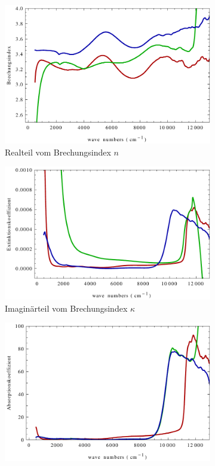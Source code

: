 \documentclass[paper=a4,fontsize=10pt,DIV=18,twocolumn,parskip=half]{scrartcl}
\numberwithin{equation}{section}    %
\begin{document}
\begin{figure}
    \centering
    \begin{subfigure}{\columnwidth}
        \includegraphics[width=\textwidth]{Bilder/brechzahl}
        \caption{Realteil vom Brechungsindex $n$}
        \label{bz}
    \end{subfigure}
    \begin{subfigure}{\columnwidth}
        \includegraphics[width=\textwidth]{Bilder/extinktion.pdf}
        \caption{Imaginärteil vom Brechungsindex $\kappa$}
        \label{ex}
    \end{subfigure}
    \begin{subfigure}{\columnwidth}
        \includegraphics[width=\textwidth]{Bilder/absorption.pdf}

\end{subfigure}
\end{figure}
\end{document}
